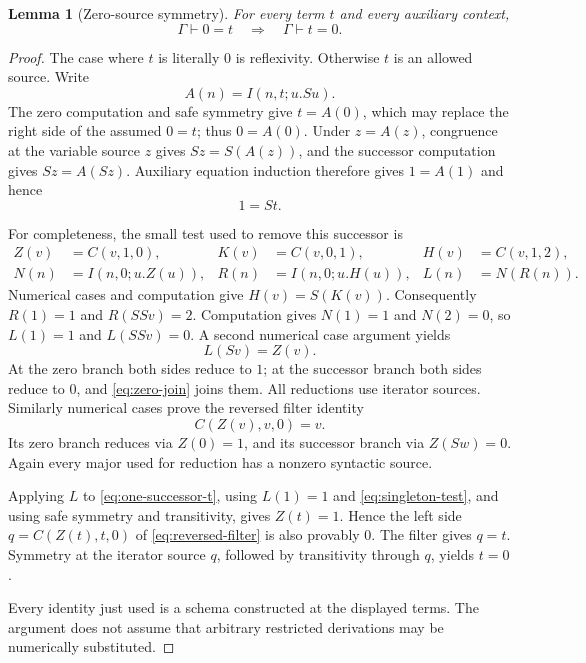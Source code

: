 \documentclass[11pt,letterpaper]{article}
\newtheorem{lemma}[theorem]{Lemma}
\theoremstyle{definition}
\begin{document}
\begin{lemma}[Zero-source symmetry]\label{lem:zero-symmetry}
For every term $t$ and every auxiliary context,
\[
 \Gamma\vdash 0=t\quad\Longrightarrow\quad\Gamma\vdash t=0.
\]
\end{lemma}
\begin{proof}
The case where $t$ is literally $0$ is reflexivity.  Otherwise $t$ is an
allowed source.  Write
\[
 A(n)=I(n,t;u.Su).
\]
The zero computation and safe symmetry give $t=A(0)$, which may replace
the right side of the assumed $0=t$; thus $0=A(0)$.  Under
$z=A(z)$, congruence at the variable source $z$ gives
$Sz=S(A(z))$, and the successor computation gives $Sz=A(Sz)$.
Auxiliary equation induction therefore gives $1=A(1)$ and hence
\begin{equation}
 1=St.
 \label{eq:one-successor-t}
\end{equation}

For completeness, the small test used to remove this successor is
\[
 \begin{aligned}
 Z(v)&=C(v,1,0),& K(v)&=C(v,0,1),& H(v)&=C(v,1,2),\\
 N(n)&=I(n,0;u.Z(u)),& R(n)&=I(n,0;u.H(u)),& L(n)&=N(R(n)).
 \end{aligned}
\]
Numerical cases and computation give $H(v)=S(K(v))$.  Consequently
$R(1)=1$ and $R(SSv)=2$.  Computation gives $N(1)=1$ and $N(2)=0$,
so $L(1)=1$ and $L(SSv)=0$.  A second numerical case argument yields
\begin{equation}
 L(Sv)=Z(v).
 \label{eq:singleton-test}
\end{equation}
At the zero branch both sides reduce to $1$; at the successor branch
both sides reduce to $0$, and \eqref{eq:zero-join} joins them.  All
reductions use iterator sources.  Similarly numerical cases prove the
reversed filter identity
\begin{equation}
 C(Z(v),v,0)=v.
 \label{eq:reversed-filter}
\end{equation}
Its zero branch reduces via $Z(0)=1$, and its successor branch via
$Z(Sw)=0$.  Again every major used for reduction has a nonzero
syntactic source.

Applying $L$ to \eqref{eq:one-successor-t}, using
$L(1)=1$ and \eqref{eq:singleton-test}, and using safe symmetry and
transitivity, gives $Z(t)=1$.  Hence the left side
$q=C(Z(t),t,0)$ of \eqref{eq:reversed-filter} is also provably $0$.
The filter gives $q=t$.  Symmetry at the iterator source $q$, followed
by transitivity through $q$, yields $t=0$.

Every identity just used is a schema constructed at the displayed
terms.  The argument does not assume that arbitrary restricted
derivations may be numerically substituted.
\end{proof}
\end{document}
